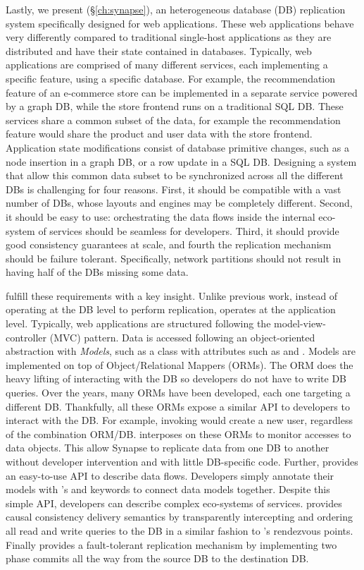 Lastly, we present \synapse (\S\ref{ch:synapse}), an heterogeneous database (DB)
replication system specifically designed for web applications. These web
applications behave very differently compared to traditional single-host
applications as they are distributed and have their state contained in
databases. Typically, web applications are comprised of many different
services, each implementing a specific feature, using a specific database.
For example, the recommendation feature of an e-commerce store can be
implemented in a separate service powered by a graph DB, while the store
frontend runs on a traditional SQL DB. These services share a common subset
of the data, for example the recommendation feature would share the product
and user data with the store frontend.
Application state modifications consist of database primitive changes, such as a
node insertion in a graph DB, or a row update in a SQL DB. 
Designing a system that allow this common data subset to be synchronized across
all the different DBs is challenging for four reasons. First, it should be
compatible with a vast number of DBs, whose layouts and engines may be
completely different. Second, it should be easy to use: orchestrating the data
flows inside the internal eco-system of services should be seamless for developers.
Third, it should provide good consistency guarantees at scale, and fourth
the replication mechanism should be failure tolerant. Specifically, network partitions
should not result in having half of the DBs missing some data.

\synapse fulfill these requirements with a key insight. Unlike previous work,
instead of operating at the DB level to perform replication, \synapse operates
at the application level. Typically, web applications are structured following
the model-view-controller (MVC) pattern. Data is accessed following an object-oriented
abstraction with {\em Models}, such as a  class with attributes such
as  and . Models are implemented on top of Object/Relational Mappers (ORMs).
The ORM does the heavy lifting of interacting with the DB so developers
do not have to write DB queries. Over the years, many ORMs have been developed,
each one targeting a different DB. Thankfully, all these ORMs expose a similar API
to developers to interact with the DB. For example, invoking
 would create a new user, regardless of the combination
ORM/DB.  \synapse interposes on these ORMs to monitor accesses to data objects.
This allow Synapse to replicate data from
one DB to another without developer intervention and with little DB-specific code.
Further, \synapse provides an easy-to-use API to describe data flows. Developers simply
annotate their models with \synapse's  and 
keywords to connect data models together.
Despite this simple API, developers can describe complex eco-systems
of services. \synapse provides causal consistency delivery semantics by
transparently intercepting and ordering all read and write queries to the DB in
a similar fashion to \scribe's rendezvous points. Finally \synapse provides
a fault-tolerant replication mechanism by implementing two phase commits all
the way from the source DB to the destination DB.


